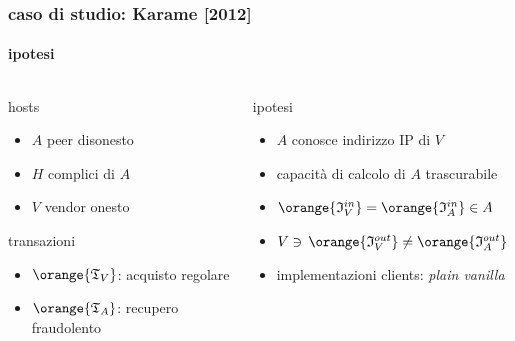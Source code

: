 \begin{frame}
	\frametitle{caso di studio: Karame [2012]}
	\framesubtitle{ipotesi}


	\begin{columns}
	 \begin{column}{.45\textwidth}
		hosts
		\begin{itemize}
		  \item $A$ peer disonesto
		  \item $H$ complici di $A$ 
		  \item $V$ vendor onesto
		\end{itemize}
		transazioni
		\begin{itemize}
		  \item $\orange{\mathfrak{T}_V}$: acquisto regolare
		  \item $\orange{\mathfrak{T}_A}$: recupero fraudolento
		\end{itemize}
	\end{column}
	
	\begin{column}{.65\textwidth}
		ipotesi
		\begin{itemize}
		  \item $A$ conosce indirizzo IP di $V$
		  \item capacità di calcolo di $A$ trascurabile %
		  \item $\orange{\mathfrak{I}_V^{in}} = \orange{\mathfrak{I}_A^{in}} \in A$ 
		  \item $ V \ni\, \orange{\mathfrak{I}_V^{out}} \neq \orange{\mathfrak{I}_A^{out}} \in A$
		  \item implementazioni clients: \textit{plain vanilla} %
	 	\end{itemize}
 	\end{column}
 	\end{columns}

\end{frame}
